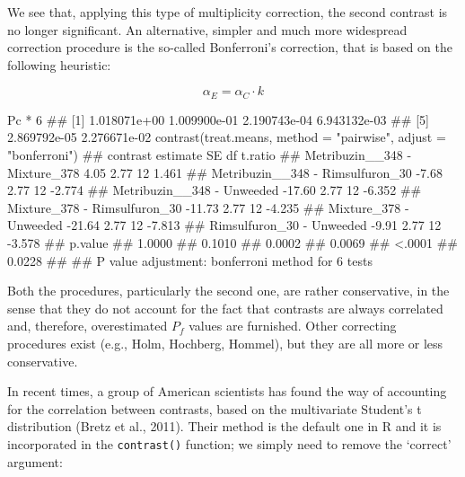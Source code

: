 \documentclass[a4paper,12pt,oneside]{book}
\newenvironment{Shaded}{\begin{snugshade}}{\end{snugshade}}
\newcommand{\DecValTok}[1]{#1}
\newcommand{\SpecialCharTok}[1]{#1}
\newcommand{\StringTok}[1]{#1}
\newcommand{\DocumentationTok}[1]{#1}
\newcommand{\FunctionTok}[1]{#1}
\newcommand{\AttributeTok}[1]{#1}
\newcommand{\NormalTok}[1]{#1}
\begin{document}
\normalsize

We see that, applying this type of multiplicity correction, the second contrast is no longer significant. An alternative, simpler and much more widespread correction procedure is the so-called Bonferroni's correction, that is based on the following heuristic:

\[\alpha_E = \alpha_C \cdot k\]

\begin{Shaded}
\begin{Highlighting}[]
\NormalTok{Pc }\SpecialCharTok{*} \DecValTok{6}
\DocumentationTok{\#\# [1] 1.018071e+00 1.009900e{-}01 2.190743e{-}04 6.943132e{-}03}
\DocumentationTok{\#\# [5] 2.869792e{-}05 2.276671e{-}02}
\FunctionTok{contrast}\NormalTok{(treat.means, }\AttributeTok{method =} \StringTok{"pairwise"}\NormalTok{, }\AttributeTok{adjust =} \StringTok{"bonferroni"}\NormalTok{)}
\DocumentationTok{\#\#  contrast                         estimate   SE df t.ratio}
\DocumentationTok{\#\#  Metribuzin\_\_348 {-} Mixture\_378        4.05 2.77 12  1.461 }
\DocumentationTok{\#\#  Metribuzin\_\_348 {-} Rimsulfuron\_30    {-}7.68 2.77 12 {-}2.774 }
\DocumentationTok{\#\#  Metribuzin\_\_348 {-} Unweeded         {-}17.60 2.77 12 {-}6.352 }
\DocumentationTok{\#\#  Mixture\_378 {-} Rimsulfuron\_30       {-}11.73 2.77 12 {-}4.235 }
\DocumentationTok{\#\#  Mixture\_378 {-} Unweeded             {-}21.64 2.77 12 {-}7.813 }
\DocumentationTok{\#\#  Rimsulfuron\_30 {-} Unweeded           {-}9.91 2.77 12 {-}3.578 }
\DocumentationTok{\#\#  p.value}
\DocumentationTok{\#\#  1.0000 }
\DocumentationTok{\#\#  0.1010 }
\DocumentationTok{\#\#  0.0002 }
\DocumentationTok{\#\#  0.0069 }
\DocumentationTok{\#\#  \textless{}.0001 }
\DocumentationTok{\#\#  0.0228 }
\DocumentationTok{\#\# }
\DocumentationTok{\#\# P value adjustment: bonferroni method for 6 tests}
\end{Highlighting}
\end{Shaded}

Both the procedures, particularly the second one, are rather conservative, in the sense that they do not account for the fact that contrasts are always correlated and, therefore, overestimated \(P_f\) values are furnished. Other correcting procedures exist (e.g., Holm, Hochberg, Hommel), but they are all more or less conservative.

In recent times, a group of American scientists has found the way of accounting for the correlation between contrasts, based on the multivariate Student's t distribution (Bretz et al., 2011). Their method is the default one in R and it is incorporated in the \texttt{contrast()} function; we simply need to remove the `correct' argument:
\end{document}
